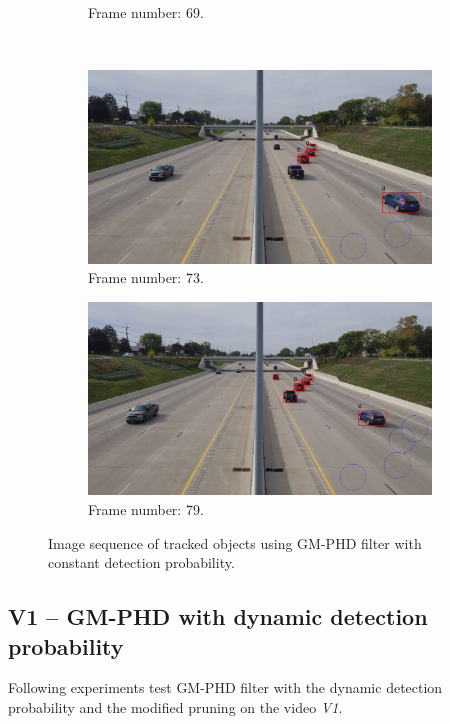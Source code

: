 \begin{figure}[H]
\begin{subfigure}{0.48\textwidth}
        \caption{Frame number: 69.}
        \label{fig:E1-V1-S0:06}
    \end{subfigure}
    \\
    \begin{subfigure}{0.48\textwidth}
        \centering
        \includegraphics[width=\linewidth]{../../../experiments/E1/V1/noPd/73}
        \caption{Frame number: 73.}
        \label{fig:E1-V1-S0:07}
    \end{subfigure}
    \begin{subfigure}{0.48\textwidth}
        \centering
        \includegraphics[width=\linewidth]{../../../experiments/E1/V1/noPd/79}
        \caption{Frame number: 79.}
        \label{fig:E1-V1-S0:08}
    \end{subfigure}
    \caption{Image sequence of tracked objects using GM-PHD filter with constant detection probability.}
    \label{fig:E1-V1-S0}
\end{figure}

\subsection{V1 -- GM-PHD with dynamic detection probability}
Following experiments test GM-PHD filter with the dynamic detection probability and the modified pruning on the video \textit{V1}.
